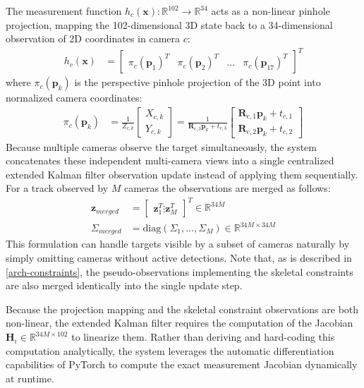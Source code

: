 The measurement function $h_c(\mathbf{x}): \mathbb{R}^{102} \to \mathbb{R}^{34}$ acts as a non-linear pinhole projection, mapping the 102-dimensional 3D state back to a 34-dimensional observation of 2D coordinates in camera $c$:
\begin{align*}
    h_c(\mathbf{x}) &= \begin{bmatrix} \pi_c(\mathbf{p}_1)^T & \pi_c(\mathbf{p}_2)^T & \dots & \pi_c(\mathbf{p}_{17})^T \end{bmatrix}^T
\end{align*}
where $\pi_c(\mathbf{p}_k)$ is the perspective pinhole projection of the 3D point into normalized camera coordinates:
\begin{align*}
    \pi_c(\mathbf{p}_k) &= \frac{1}{Z_{c,k}} \begin{bmatrix} X_{c,k} \\ Y_{c,k} \end{bmatrix} = \frac{1}{\mathbf{R}_{c,3} \mathbf{p}_k + t_{c,3}} \begin{bmatrix} \mathbf{R}_{c,1} \mathbf{p}_k + t_{c,1} \\ \mathbf{R}_{c,2} \mathbf{p}_k + t_{c,2} \end{bmatrix}
\end{align*}
Because multiple cameras observe the target simultaneously, the system concatenates these independent multi-camera views into a single centralized extended Kalman filter observation update instead of applying them sequentially. For a track observed by $M$ cameras the observations are merged as follows:
\begin{align*}
    \mathbf{z}_{merged} &= \begin{bmatrix} \mathbf{z}_1^T \vdots \mathbf{z}_M^T \end{bmatrix}^T \in \mathbb{R}^{34M} \\
    \Sigma_{merged} &= \text{diag}(\Sigma_1, \dots, \Sigma_M) \in \mathbb{R}^{34M \times 34M}
\end{align*}
This formulation can handle targets visible by a subset of cameras naturally by simply omitting cameras without active detections. Note that, as is described in \cref{arch-constraints}, the pseudo-observations implementing the skeletal constraints are also merged identically into the single update step.

Because the projection mapping and the skeletal constraint observations are both non-linear, the extended Kalman filter requires the computation of the Jacobian $\mathbf{H}_i \in \mathbb{R}^{34M \times 102}$ to linearize them. Rather than deriving and hard-coding this computation analytically, the system leverages the automatic differentiation capabilities of PyTorch \parencite{paszke2019pytorch,ansel2024pytorch} to compute the exact measurement Jacobian dynamically at runtime.


